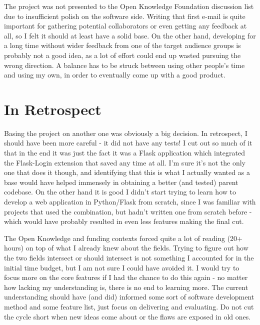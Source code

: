 The project was not presented to the Open Knowledge Foundation discussion list due to insufficient polish on the software side. Writing that first e-mail is quite important for gathering potential collaborators or even getting any feedback at all, so I felt it should at least have a solid base. On the other hand, developing for a long time without wider feedback from one of the target audience groups is probably not a good idea, as a lot of effort could end up wasted pursuing the wrong direction. A balance has to be struck between using other people's time and using my own, in order to eventually come up with a good product.

\section{In Retrospect}

Basing the project on another one was obviously a big decision. In retrospect, I should have been more careful - it did not have any tests! I cut out so much of it that in the end it was just the fact it was a Flask application which integrated the Flask-Login extension that saved any time at all. I'm sure it's not the only one that does it though, and identifying that this is what I actually wanted as a base would have helped immensely in obtaining a better (and tested) parent codebase. On the other hand it is good I didn't start trying to learn how to develop a web application in Python/Flask from scratch, since I was familiar with projects that used the combination, but hadn't written one from scratch before - which would have probably resulted in even less features making the final cut.

The Open Knowledge and funding contexts forced quite a lot of reading (20+ hours) on top of what I already knew about the fields. Trying to figure out how the two fields intersect or should intersect is not something I accounted for in the initial time budget, but I am not sure I could have avoided it. I would try to focus more on the core features if I had the chance to do this again - no matter how lacking my understanding is, there is no end to learning more. The current understanding should have (and did) informed some sort of software development method and some feature list, just focus on delivering and evaluating. Do not cut the cycle short when new ideas come about or the flaws are exposed in old ones.

